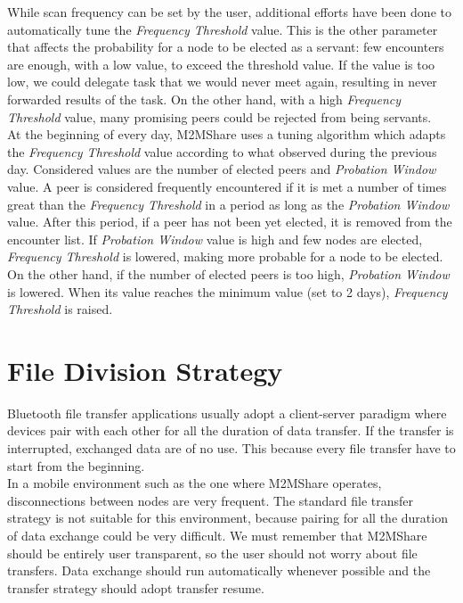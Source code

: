 While scan frequency can be set by the user, additional efforts have been done to automatically tune the \textit{Frequency Threshold} value. This is the other parameter that affects the probability  for a node to be elected as a servant: few encounters are enough, with a low value, to exceed the threshold value. If the value is too low, we could delegate task that we would never meet again, resulting in never forwarded results of the task. On the other hand, with a high \textit{Frequency Threshold} value, many promising peers could be rejected from being servants.
\\

At the beginning of every day, M2MShare uses a tuning algorithm which adapts the \textit{Frequency Threshold} value according to what observed during the previous day. Considered values are the number of elected peers and \textit{Probation Window} value. A peer is considered frequently encountered if it is met a number of times great than the \textit{Frequency Threshold} in a period as long as the \textit{Probation Window} value. After this period, if a peer has not been yet elected, it is removed from the encounter list. If \textit{Probation Window} value is high and few nodes are elected, \textit{Frequency Threshold} is lowered, making more probable for a node to be elected. On the other hand, if the number of elected peers is too high, \textit{Probation Window} is lowered. When its value reaches the minimum value (set to 2 days), \textit{Frequency Threshold} is raised.


\section{File Division Strategy}
\label{descrFileDivisionStrategy}
Bluetooth file transfer applications usually adopt a client-server paradigm where devices pair with each other for all the duration of data transfer. If the transfer is interrupted, exchanged data are of no use. This because every file transfer have to start from the beginning. 
\\

In a mobile environment such as the one where M2MShare operates, disconnections between nodes are very frequent. The standard file transfer strategy is not suitable for this environment, because pairing for all the duration of data exchange could be very difficult. We must remember that M2MShare should be entirely user transparent, so the user should not worry about file transfers. Data exchange should run automatically whenever possible and the transfer strategy should adopt transfer resume.
\\

